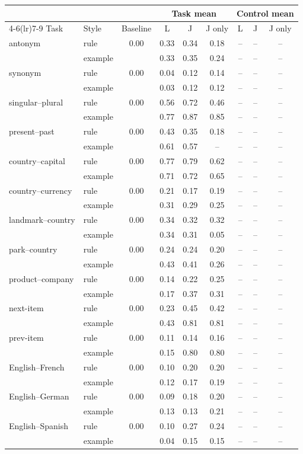 \begin{tabular}{@{}llccccccc@{}}
\toprule
 & & & \multicolumn{3}{c}{Task mean} & \multicolumn{3}{c}{Control mean} \\
\cmidrule(lr){4-6}\cmidrule(lr){7-9}
Task & Style & Baseline & L & J & J only & L & J & J only \\
\midrule
antonym & rule & 0.00 & 0.33 & 0.34 & 0.18 & -- & -- & -- \\
 & example &  & 0.33 & 0.35 & 0.24 & -- & -- & -- \\
synonym & rule & 0.00 & 0.04 & 0.12 & 0.14 & -- & -- & -- \\
 & example &  & 0.03 & 0.12 & 0.12 & -- & -- & -- \\
singular--plural & rule & 0.00 & 0.56 & 0.72 & 0.46 & -- & -- & -- \\
 & example &  & 0.77 & 0.87 & 0.85 & -- & -- & -- \\
present--past & rule & 0.00 & 0.43 & 0.35 & 0.18 & -- & -- & -- \\
 & example &  & 0.61 & 0.57 & -- & -- & -- & -- \\
country--capital & rule & 0.00 & 0.77 & 0.79 & 0.62 & -- & -- & -- \\
 & example &  & 0.71 & 0.72 & 0.65 & -- & -- & -- \\
country--currency & rule & 0.00 & 0.21 & 0.17 & 0.19 & -- & -- & -- \\
 & example &  & 0.31 & 0.29 & 0.25 & -- & -- & -- \\
landmark--country & rule & 0.00 & 0.34 & 0.32 & 0.32 & -- & -- & -- \\
 & example &  & 0.34 & 0.31 & 0.05 & -- & -- & -- \\
park--country & rule & 0.00 & 0.24 & 0.24 & 0.20 & -- & -- & -- \\
 & example &  & 0.43 & 0.41 & 0.26 & -- & -- & -- \\
product--company & rule & 0.00 & 0.14 & 0.22 & 0.25 & -- & -- & -- \\
 & example &  & 0.17 & 0.37 & 0.31 & -- & -- & -- \\
next-item & rule & 0.00 & 0.23 & 0.45 & 0.42 & -- & -- & -- \\
 & example &  & 0.43 & 0.81 & 0.81 & -- & -- & -- \\
prev-item & rule & 0.00 & 0.11 & 0.14 & 0.16 & -- & -- & -- \\
 & example &  & 0.15 & 0.80 & 0.80 & -- & -- & -- \\
English--French & rule & 0.00 & 0.10 & 0.20 & 0.20 & -- & -- & -- \\
 & example &  & 0.12 & 0.17 & 0.19 & -- & -- & -- \\
English--German & rule & 0.00 & 0.09 & 0.18 & 0.20 & -- & -- & -- \\
 & example &  & 0.13 & 0.13 & 0.21 & -- & -- & -- \\
English--Spanish & rule & 0.00 & 0.10 & 0.27 & 0.24 & -- & -- & -- \\
 & example &  & 0.04 & 0.15 & 0.15 & -- & -- & -- \\
\bottomrule
\end{tabular}
